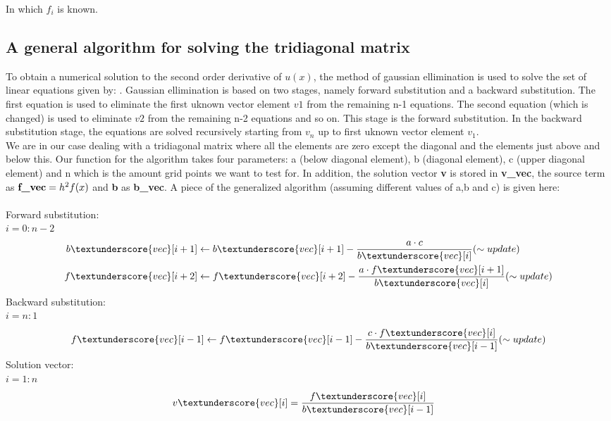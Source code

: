 \documentclass{article}
\begin{document}
In which $f_i$ is known. 



\subsection{A general algorithm for solving the tridiagonal matrix}
To obtain a numerical solution to the second order derivative of $u(x)$, the method of gaussian ellimination is used to solve the set of linear equations given by: . 
Gaussian ellimination is based on two stages, namely forward substitution and a backward substitution. The first equation is used to eliminate the first uknown vector element $v1$ from the remaining n-1 equations. The second equation (which is changed) is used to eliminate $v2$ from the remaining n-2 equations and so on. This stage is the forward substitution. In the backward substitution stage, the equations are solved recursively starting from $v_n$ up to first uknown vector element $v_1$. \\ We are in our case dealing with a tridiagonal matrix where all the elements are zero except the diagonal and the elements just above and below this. Our function for the algorithm takes four parameters: a (below diagonal element), b (diagonal element), c (upper diagonal element) and n which is the amount grid points we want to test for. In addition, the solution vector \textbf{v} is stored in \textbf{v{\_}vec}, the source term as $\textbf{f\textunderscore{vec}} = h^2f(x)$ and \textbf{b} as \textbf{b{\_}vec}.
A piece of the generalized algorithm (assuming different values of a,b and c) is given here: 
\\\\
Forward substitution:\\
$i=0:n-2$
\begin{align*}
b\textunderscore{vec}[i+1] & \leftarrow b\textunderscore{vec}[i+1]  - \frac{a \cdot c}{b\textunderscore{vec}[i]}     (\sim update)\\
f\textunderscore{vec}[i+2] &\leftarrow f\textunderscore{vec}[i+2]  - \frac{a \cdot f\textunderscore{vec}[i+1]}{b\textunderscore{vec}[i]}      (\sim update)\\
\end{align*}
Backward substitution: \\
$i = n:1 $
\begin{align*}
f\textunderscore{vec}[i-1] & \leftarrow f\textunderscore{vec}[i-1] - \frac{c \cdot f\textunderscore{vec}[i]}{b\textunderscore{vec}[i-1]}      (\sim update)\\
\end{align*}
Solution vector:\\
$i =1:n$
\begin{align*}
v\textunderscore{vec}[i] & = \frac{f\textunderscore{vec}[i]}{b\textunderscore{vec}[i-1]}
\end{align*}
\end{document}
